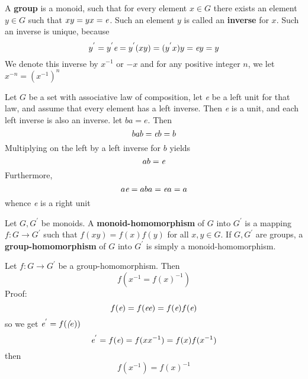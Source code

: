 \documentclass[a4paper, 11pt]{article}
\begin{document}
\begin{CJK}{UTF8}{gbsn}
A \textbf{group} is a monoid, such that for every element $x \in G$ there exists an element $y \in G$ such that $xy = yx = \emph{e}$. Such an element $y$ is called an
\textbf{inverse} for $x$. Such an inverse is unique, because
\[y^{'} = y^{'}\emph{e} = y^{'}(xy) = (y^{'}x)y = \emph{e}y = y\]
We denote this inverse by $x^{-1}$ or $-x$ and for any positive integer $n$, we let $x^{-n} = (x^{-1})^{n}$\par

Let $G$ be a set with associative law of composition, let \emph{e} be a left unit for that law, and assume that every element has a left inverse. Then \emph{e} is a unit, and each left inverse is also an inverse.
let $ba = e$. Then
\[bab = \emph{e}b = b\]
Multiplying on the left by a left inverse for $b$ yields
\[ab = \emph{e}\]
Furthermore,
\[a\emph{e} = aba = \emph{e}a = a\]
whence \emph{e} is a right unit\par

Let $G, G^{'}$ be monoids. A \textbf{monoid-homomorphism} of $G$ into $G^{'}$ is a mapping $f: G \longrightarrow G^{'}$ such that $f(xy) = f(x)f(y)$ for all $x, y \in G$. If $G, G^{'}$ are groups, a \textbf{group-homomorphism} of $G$ into $G^{'}$ is simply a monoid-homomorphism.\par

Let $f: G \longrightarrow G^{'}$ be a group-homomorphism. Then
\[f(x^{-1} = f(x)^{-1})\]
Proof:
\[f(\emph{e}) = f(\emph{ee}) = f(\emph{e})f(\emph{e})\]
so we get $\emph{e}^{'} = f(\emph(e))$
\[\emph{e}^{'} = f(\emph{e}) = f(xx^{-1}) = f(x)f(x^{-1})\]
then
\[f(x^{-1}) = f(x)^{-1}\]
\end{CJK}
\end{document}
